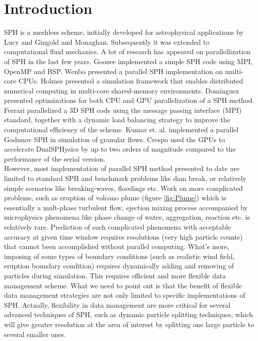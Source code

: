 \documentclass[conference,compsoc]{IEEEtran}
\begin{document}
\section{Introduction}
SPH is a meshless scheme, initially developed for astrophysical applications by Lucy\cite{lucy1977numerical} and Gingold and Monaghan\cite{gingold1977smoothed}. 
Subsequently it was extended to computational fluid mechanics. 
A lot of research has appeared  on  parallellization of SPH in the last few years. 
Goozee\cite{goozee2003distributed} implemented a simple SPH code using MPI, OpenMP and BSP. 
Wenbo\cite{wenbo2014performance} presented a parallel SPH implementation on multi-core CPUs. 
Holmes\cite{holmes2011framework} presented a simulation framework that enables distributed numerical computing in multi-core shared-memory environments. 
Dominguez\cite{dominguez2011optimization} presented optimizations for both CPU and GPU parallelization of a SPH method. 
Ferrari\cite{ferrari2009new} parallelized a 3D SPH code using the message passing interface (MPI) standard, together with a dynamic load balancing strategy to improve the computational efficiency of the scheme. 
Kumar et. al. \cite{kumar2013parallel} implemented a parallel Godunov SPH in simulation of granular flows.
Crespo\cite{crespo2015dualsphysics} used the GPUs to accelerate DualSPHysics by up to two orders of magnitude compared to the performance of the serial version.\\
However, most implementation of parallel SPH method presented to date are limited to standard SPH and benchmark problems like dam break, or relatively
simple scenarios like breaking-waves, floodings etc. Work on more complicated problems, such as eruption of volcano plume (figure \ref{fig:Plume}) which is essentially a mult-phase turbulent flow,
ejection mixing process accompanied by microphysics phenomena like phase change of water, aggregation, reaction etc. is relatively rare. 
Prediction of such complicated phenomena with acceptable accuracy at given time window requires resolutions (very high particle counts) that cannot been accomplished without parallel computing. What's more, imposing of some types of boundary conditions (such as realistic wind field, eruption boundary condition) requires dynamically adding and removing of particles during simulation. This requires efficient and more flexible data management scheme. What we need to point out is that the benefit of flexible data management strategies are not only limited to specific implementations of SPH. Actually, flexibility in data management are more critical for several advanced techniques of SPH, such as dynamic particle splitting techniques\cite{vacondio2012accurate, feldman2007dynamic}, which will give greater resolution at the area of interest by splitting one large particle to several smaller ones.
\end{document}
